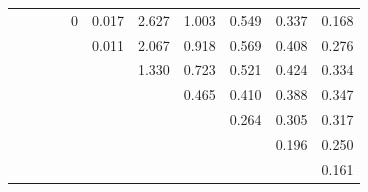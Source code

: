 \begin{table}[H]
\begin{tabular}{ccccccccccc}
     &                            &           &       & 0     & 0.017 & 2.627 & 1.003 & 0.549 & 0.337 & 0.168 \\
     &                            &           &       &       & 0.011 & 2.067 & 0.918 & 0.569 & 0.408 & 0.276 \\
&  &           &       &       &       & 1.330 & 0.723 & 0.521 & 0.424 & 0.334 \\
 &  &           &       &       &       &       & 0.465 & 0.410 & 0.388 & 0.347 \\
 & &           &       &       &       &       &       & 0.264 & 0.305 & 0.317 \\
&  &     &   &       &       &       &       &       & 0.196 & 0.250 \\
 &        &           &       &       &       &       &       &       &       & 0.161\\
 \bottomrule
    \end{tabular}
    \end{table}

